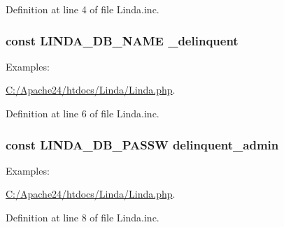 Definition at line 4 of file Linda.\+inc.

\hypertarget{_linda_8inc_a4e480c562d1f6701e89f603607ddbb54}{}
\subsubsection[{L\+I\+N\+D\+A\+\_\+\+D\+B\+\_\+\+N\+A\+M\+E}]{\setlength{\rightskip}{0pt plus 5cm}const L\+I\+N\+D\+A\+\_\+\+D\+B\+\_\+\+N\+A\+M\+E \textquotesingle{}\+\_\+delinquent\textquotesingle{}}\label{_linda_8inc_a4e480c562d1f6701e89f603607ddbb54}
\begin{Desc}
\item[Examples\+: ]\par
\hyperlink{_c_1_2_apache24_2htdocs_2_linda_2_linda_8php-example}{C\+:/\+Apache24/htdocs/\+Linda/\+Linda.\+php}.\end{Desc}


Definition at line 6 of file Linda.\+inc.

\hypertarget{_linda_8inc_aef9b254dff90502b875151a93b462df1}{}
\subsubsection[{L\+I\+N\+D\+A\+\_\+\+D\+B\+\_\+\+P\+A\+S\+S\+W}]{\setlength{\rightskip}{0pt plus 5cm}const L\+I\+N\+D\+A\+\_\+\+D\+B\+\_\+\+P\+A\+S\+S\+W \textquotesingle{}delinquent\+\_\+admin\textquotesingle{}}\label{_linda_8inc_aef9b254dff90502b875151a93b462df1}
\begin{Desc}
\item[Examples\+: ]\par
\hyperlink{_c_1_2_apache24_2htdocs_2_linda_2_linda_8php-example}{C\+:/\+Apache24/htdocs/\+Linda/\+Linda.\+php}.\end{Desc}


Definition at line 8 of file Linda.\+inc.

\hypertarget{_linda_8inc_a75c0048bcb27b8bf9d4e9fd1b9eb023b}{}
